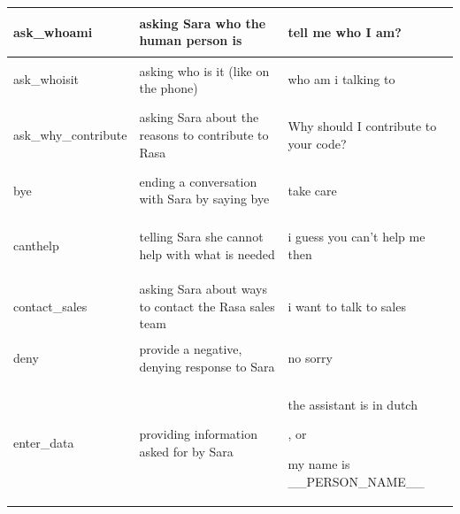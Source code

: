 \documentclass[bsc,frontabs,twoside,singlespacing,parskip,deptreport]{infthesis}
\begin{document}
{\begin{center}
\begin{longtable}{p{}|p{}|p{}}
    \hline
    \begin{spverbatim}ask_whoami\end{spverbatim} & asking Sara who the human person is & \begin{spverbatim}tell me who I am?\end{spverbatim} \\
    \hline
    \begin{spverbatim}ask_whoisit\end{spverbatim} & asking who is it (like on the phone) & \begin{spverbatim}who am i talking to\end{spverbatim} \\
    \hline
    \begin{spverbatim}ask_why_contribute\end{spverbatim} & asking Sara about the reasons to contribute to Rasa & \begin{spverbatim}Why should I contribute to your code?\end{spverbatim} \\
    \hline
    \begin{spverbatim}bye\end{spverbatim} & ending a conversation with Sara by saying bye & \begin{spverbatim}take care\end{spverbatim} \\
    \hline
    \begin{spverbatim}canthelp\end{spverbatim} & telling Sara she cannot help with what is needed & \begin{spverbatim}i guess you can't help me then\end{spverbatim} \\
    \hline
    \begin{spverbatim}contact_sales\end{spverbatim} & asking Sara about ways to contact the Rasa sales team & \begin{spverbatim}i want to talk to sales\end{spverbatim} \\
    \hline
    \begin{spverbatim}deny\end{spverbatim} & provide a negative, denying response to Sara & \begin{spverbatim}no sorry\end{spverbatim} \\
    \hline
    \begin{spverbatim}enter_data\end{spverbatim} & providing information asked for by Sara & \begin{spverbatim}the assistant is in dutch\end{spverbatim}, or \begin{spverbatim}my name is __PERSON_NAME__\end{spverbatim} \\

\end{longtable}
\end{center}}
\end{document}
